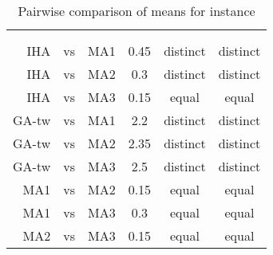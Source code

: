 \documentclass[thesis.tex]{subfiles}
\newcommand{\CurrentInstance}{}
\newcommand{\CurrentInstanceFileEscaped}{}
\newcommand{\CurrentInstanceTexEscaped}{}
\begin{document}
   \renewcommand{\CurrentInstance}{\Instance{1ubq}}
   \renewcommand{\CurrentInstanceFileEscaped}{1ubq}
   \renewcommand{\CurrentInstanceTexEscaped}{1ubq}


   \renewcommand{\CurrentInstance}{\Instance{knights8\textunderscore{}8}}
   \renewcommand{\CurrentInstanceFileEscaped}{knights8-8}
   \renewcommand{\CurrentInstanceTexEscaped}{knights8\textunderscore{}8}

\begin{table}[htbp]
   \caption{Pairwise comparison of means for instance \CurrentInstance}
   \label{fig:\CurrentInstanceFileEscaped-mannwhitneyu}
   \centering\small
      \begin{tabular}{r@{\ }c@{\ }l S[table-format=2.2] c c} \toprule
         &&&                          &  \\ \cmidrule(lr){5-6}
         &&&  &  &  \\ \midrule

         \gls{IHA} &vs& \gls{MA1}   &  0.45 & distinct & distinct \\
         \gls{IHA} &vs& \gls{MA2}   &  0.3  & distinct & distinct \\
         \gls{IHA} &vs& \gls{MA3}   &  0.15 &  equal   &  equal   \\
         \gls{GA-tw} &vs& \gls{MA1} &  2.2  & distinct & distinct \\
         \gls{GA-tw} &vs& \gls{MA2} &  2.35 & distinct & distinct \\
         \gls{GA-tw} &vs& \gls{MA3} &  2.5  & distinct & distinct \\
         \gls{MA1} &vs& \gls{MA2}   &  0.15 &  equal   &  equal   \\
         \gls{MA1} &vs& \gls{MA3}   &  0.3  &  equal   &  equal   \\
         \gls{MA2} &vs& \gls{MA3}   &  0.15 &  equal   &  equal   \\
         \bottomrule
      \end{tabular}
\end{table}
   \renewcommand{\CurrentInstance}{\Instance{1a62}}
   \renewcommand{\CurrentInstanceFileEscaped}{1a62}
\end{document}
